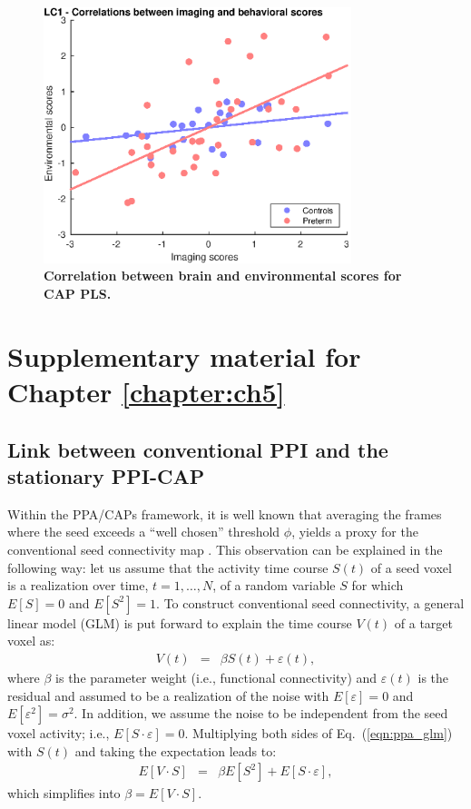 \begin{figure}[h]
\centering
\includegraphics[width=0.8\textwidth]{images/Appendix/ch3_CAPs_BrainScoresxBehavScores.eps}
\caption{\textbf{Correlation between brain and environmental scores for CAP PLS.}  }
\label{fig:ch3_CAP_brainXbehavScores}
\end{figure}


\chapter{Supplementary material for Chapter \ref{chapter:ch5}} \label{appA}

\renewcommand{\theequation}{Eq. \thechapter.\arabic{equation}}

\section{Link between conventional PPI and the stationary PPI-CAP} 


Within the PPA/CAPs framework, it is well known that averaging the frames where the seed exceeds a ``well chosen'' threshold $\phi$, yields a proxy for the conventional seed connectivity map \citep{Tagliazucchi2012,Liu2013}.
This observation can be explained in the following way:
let us assume that the activity time course $S(t)$ of a seed voxel is a realization over time, $t=1,\ldots,N$, of a random variable $S$ for which $E[S]=0$ and $E[S^2]=1$. 
To construct conventional seed connectivity, a general linear model (GLM) is put forward to explain the time course $V(t)$ of a target voxel as:
\begin{eqnarray}
\label{eqn:ppa_glm}
  V(t) & =& \beta S(t) + \varepsilon(t),
\end{eqnarray}
where $\beta$ is the parameter weight (i.e., functional connectivity) and $\varepsilon(t)$ is the residual and assumed to be a realization of the noise with $E[\varepsilon]=0$ and  $E[\varepsilon^2]=\sigma^2$. In addition, we assume the noise to be independent from the seed voxel activity; i.e., $E[S\cdot \varepsilon]=0$. Multiplying both sides of Eq.~(\ref{eqn:ppa_glm}) with $S(t)$ and taking the expectation leads to:
\begin{eqnarray}
   E[ V  \cdot S ]  & = & \beta E[S^2] + E[S \cdot \varepsilon],
\end{eqnarray}
which simplifies into $\beta=E[V\cdot S]$. 


